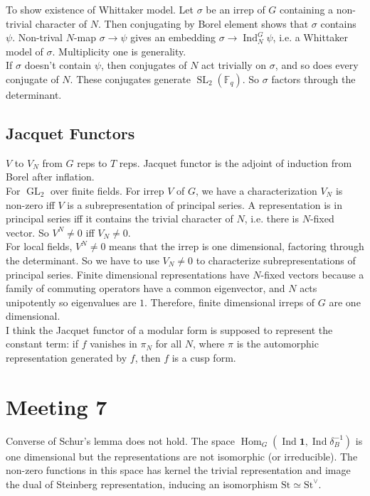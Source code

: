 \documentclass{amsart}
\numberwithin{equation}{section}
\theoremstyle{plain}
\theoremstyle{definition}
\theoremstyle{remark}
\renewcommand{\_}[2]{\underbrace{#1}_{#2}}
\renewcommand{\^}[2]{\overbrace{#1}_{#2}}
\newcommand{\Ind}{\operatorname{Ind}}
\newcommand{\Hom}{\operatorname{Hom}}
\newcommand{\GL}{\operatorname{GL}}
\newcommand{\SL}{\operatorname{SL}}
\begin{document}
To show existence of Whittaker model. Let $\sigma$ be an irrep of $G$ containing a non-trivial character of $N$. Then conjugating by Borel element shows that $\sigma$ contains $\psi$. Non-trival $N$-map $\sigma \to \psi$ gives an embedding $\sigma \to \Ind_N^G \psi$, i.e. a Whittaker model of $\sigma$. Multiplicity one is generality.\\
If $\sigma$ doesn't contain $\psi$, then conjugates of $N$ act trivially on $\sigma$, and so does every conjugate of $N$. These conjugates generate $\SL_2(\mathbb F_q)$. So $\sigma$ factors through the determinant.

\subsection{Jacquet Functors}

$V$ to $V_N$ from $G$ reps to $T$ reps. Jacquet functor is the adjoint of induction from Borel after inflation. \\

For $\GL_2$ over finite fields. For irrep $V$ of $G$, we have a characterization $V_N$ is non-zero iff $V$ is a subrepresentation of principal series. A representation is in principal series iff it contains the trivial character of $N$, i.e. there is $N$-fixed vector. So $V^N \neq 0$ iff $V_N \neq 0$.\\

For local fields, $V^N \neq 0$ means that the irrep is one dimensional, factoring through the determinant. So we have to use $V_N \neq 0$ to characterize subrepresentations of principal series. Finite dimensional representations have $N$-fixed vectors because a family of commuting operators have a common eigenvector, and $N$ acts unipotently so eigenvalues are $1$. Therefore, finite dimensional irreps of $G$ are one dimensional. \\

I think the Jacquet functor of a modular form is supposed to represent the constant term: if $f$ vanishes in $\pi_N$ for all $N$, where $\pi$ is the automorphic representation generated by $f$, then $f$ is a cusp form.

\section{Meeting 7}

Converse of Schur's lemma does not hold. The space $\Hom_G(\Ind \mathbf 1, \Ind \delta_B^{-1})$ is one dimensional but the representations are not isomorphic (or irreducible). The non-zero functions in this space has kernel the trivial representation and image the dual of Steinberg representation, inducing an isomorphism $\mathrm{St} \simeq \mathrm{St}^\vee$.\\
\end{document}
